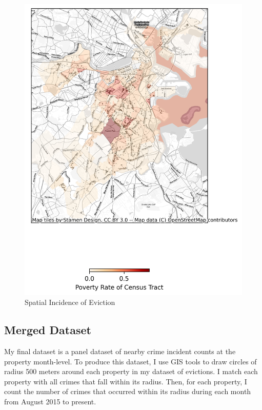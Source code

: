 \documentclass[12pt]{article}
\begin{document}
            \begin{figure}[H]
            \centering
            \includegraphics[scale=1.3]{output/summary_statistics/figures/evictions_map.png}
            \caption{Spatial Incidence of Eviction}
            \label{fig:my_label}
        \end{figure}

    \subsection{Merged Dataset}
    My final dataset is a panel dataset of nearby crime incident counts at the property month-level. To produce this dataset, I use GIS tools to draw circles of radius 500 meters around each property in my dataset of evictions. I match each property with all crimes that fall within its radius. Then, for each property, I count the number of crimes that occurred within its radius during each month from August 2015 to present. 
\end{document}
